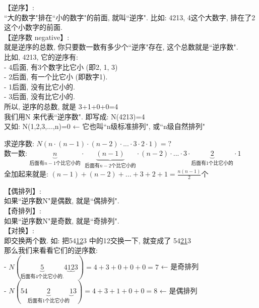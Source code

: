 \documentclass[UTF8]{ctexart}
\begin{document}
	
	【逆序】:\\
	``大的数字"排在``小的数字"的前面, 就叫``逆序". 比如: 4213,  4这个大数字, 排在了2这个小数字的前面. \\
	
	
	【逆序数 negative】:\\	
	就是逆序的总数, 你只要数一数有多少个``逆序"存在, 这个总数就是``逆序数".\\
	比如, 4213, 它的逆序有: \\
	- 4后面, 有3个数字比它小 (即2, 1, 3) \\
	- 2后面, 有一个比它小 (即数字1). \\
	- 1后面, 没有比它小的. \\
	- 3后面, 没有比它小的. \\
	所以, 逆序的总数, 就是 3+1+0+0=4 \\
	
	我们用N 来代表``逆序数". 即写成: N(4213)=4 \\
	又如: N(1,2,3,...,n)=0 ← 它也叫``n级标准排列", 或``n级自然排列"\\
	
	\begin{myEnvSample}
	求逆序数: $	N\left( n\cdot \left( n-1 \right) \cdot \left( n-2 \right) \cdot ...\cdot 3\cdot 2\cdot 1 \right) =?	$\\
	数一数: $	\underset{\text{后面有}n-1\text{个比它小的}}{\underbrace{n}}\cdot \underset{\text{后面有}n-2\text{个比它小的}}{\underbrace{\left( n-1 \right) }}\cdot \left( n-2 \right) \cdot ...\cdot 3\cdot \underset{\text{后面有1个比它小的}}{\underbrace{2}}\cdot 1		$ \\
	全加起来就是: $\left( n-1 \right) +\left( n-2 \right) +...+3+2+1=\frac{n\left( n-1 \right)}{2}$个	
	\end{myEnvSample}


	
	【偶排列】:\\
	如果``逆序数N"是偶数, 就是``偶排列". \\
	
	
	【奇排列】:\\
	如果``逆序数N"是奇数, 就是``奇排列".	\\
	
	【对换】:\\
	即交换两个数. 如: 把54\underline{12}3 中的12交换一下, 就变成了 54\underline{21}3 \\
	那么我们来看看它们的逆序数:\\
	- $N\left( \underset{\text{后面有4个比它小的}.}{\underbrace{5}}4\underset{}{\underbrace{1}}\underset{}{\underbrace{2}}3 \right) =4+3+0+0+0=7	$ ← 是奇排列\\
	- $N\left( 54\underset{\text{后面有1个比它小的}}{\underbrace{2}}\underset{}{\underbrace{1}}3 \right) =4+3+1+0+0=8		$ ← 是偶排列\\
	
\end{document}
